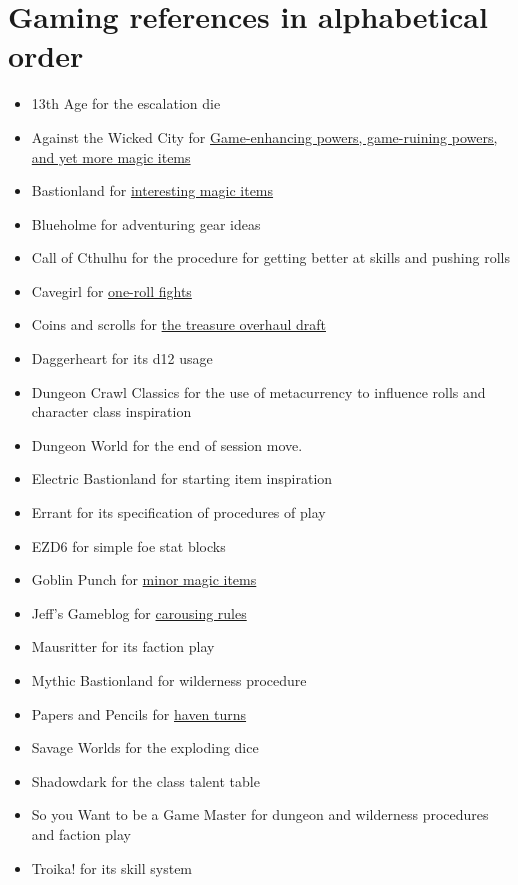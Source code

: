 \documentclass{article}
\begin{document}
\section{Gaming references in alphabetical order}
\label{app:references}
\begin{itemize}
    \item 13th Age for the escalation die
    \item Against the Wicked City for \href{https://udan-adan.blogspot.com/2021/10/game-enhancing-powers-game-ruining.html?utm_source=substack&utm_medium=email}{Game-enhancing powers, game-ruining powers, and yet more magic items}
    \item Bastionland for \href{https://www.bastionland.com/2009/07/100-interesting-magic-items-first-half.html}{interesting magic items}
    \item Blueholme for adventuring gear ideas
    \item Call of Cthulhu for the procedure for getting better at skills and pushing rolls
    \item Cavegirl for \href{https://cavegirlgames.blogspot.com/2018/03/one-roll-fights.html}{one-roll fights}
    \item Coins and scrolls for \href{https://coinsandscrolls.blogspot.com/2024/01/osr-treasure-overhaul.html}{the treasure overhaul draft}
    \item Daggerheart for its d12 usage
    \item Dungeon Crawl Classics for the use of metacurrency to influence rolls and character 
          class inspiration
    \item Dungeon World for the end of session move.
    \item Electric Bastionland for starting item inspiration 
    \item Errant for its specification of procedures of play
    \item EZD6 for simple foe stat blocks
    \item Goblin Punch for \href{https://goblinpunch.blogspot.com/2015/01/d100-minor-magical-items.html}{minor magic items}
    \item Jeff's Gameblog for \href{https://jrients.blogspot.com/2008/12/party-like-its-999.html}{carousing rules}
    \item Mausritter for its faction play
    \item Mythic Bastionland for wilderness procedure
    \item Papers and Pencils for \href{https://www.paperspencils.com/the-haven-turn/}{haven turns}
    \item Savage Worlds for the exploding dice
    \item Shadowdark for the class talent table
    \item So you Want to be a Game Master for dungeon and wilderness procedures and faction play
    \item Troika! for its skill system
\end{itemize}
\end{document}
